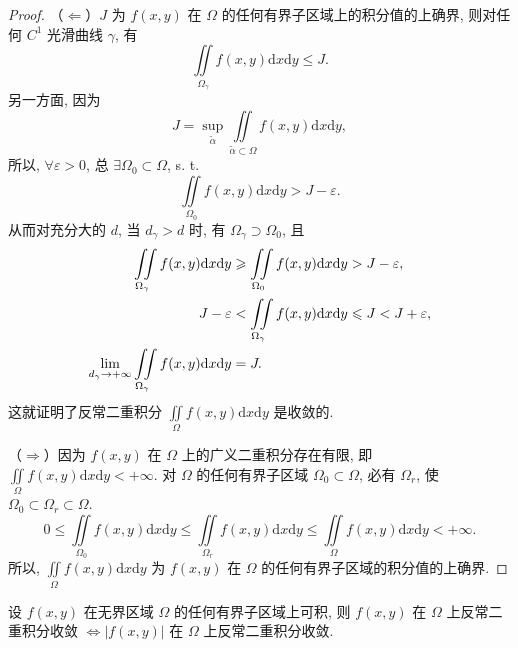 \begin{proof}
（$\Leftarrow$）$J$ 为 $f(x, y)$ 在 $\Omega$ 的任何有界子区域上的积分值的上确界,
则对任何 $C^{1}$ 光滑曲线 $\gamma$, 有
\[
\iint\limits_{\Omega_{\gamma}} f(x,y) \mathrm{d}x\mathrm{d}y \leqslant J.
\]
另一方面, 因为
\[
J = \sup\limits_{\tilde{\alpha}} \iint\limits_{\tilde{\alpha} \subset \Omega} f(x,y) \mathrm{d}x\mathrm{d}y,
\]
所以, $\forall \varepsilon > 0$, 总 $\exists \Omega_{0} \subset \Omega$, s. t.\
\[
\iint\limits_{\Omega_{0}} f(x,y) \mathrm{d}x\mathrm{d}y > J - \varepsilon.
\]
从而对充分大的 $d$, 当 $d_{\gamma} > d$ 时, 有 $\Omega_{\gamma} \supset \Omega_{0}$, 且
\[
\begin{aligned}
\iint\limits_{\Omega_{\gamma}} f(x,y) \mathrm{d}x\mathrm{d}y
&\geqslant \iint\limits_{\Omega_{0}} f(x,y) \mathrm{d}x\mathrm{d}y > J - \varepsilon, \notag\\
J - \varepsilon &< \iint\limits_{\Omega_{\gamma}} f(x,y) \mathrm{d}x\mathrm{d}y
\leqslant J < J + \varepsilon, \notag\\
\lim_{d_{\gamma} \to +\infty} \iint\limits_{\Omega_{\gamma}} f(x,y) \mathrm{d}x\mathrm{d}y &= J. \notag
\end{aligned}
\]
这就证明了反常二重积分 $\iint\limits_{\Omega} f(x,y) \mathrm{d}x\mathrm{d}y$ 是收敛的.

（$\Rightarrow$）因为 $f(x, y)$ 在 $\Omega$ 上的广义二重积分存在有限, 即
$\iint\limits_{\Omega} f(x,y) \mathrm{d}x\mathrm{d}y < +\infty$.
对 $\Omega$ 的任何有界子区域 $\Omega_{0} \subset \Omega$, 必有 $\Omega_{r}$, 使
$\Omega_{0} \subset \Omega_{r} \subset \Omega$.
\[
0 \leqslant \iint\limits_{\Omega_{0}} f(x,y) \mathrm{d}x\mathrm{d}y
\leqslant \iint\limits_{\Omega_{r}} f(x,y) \mathrm{d}x\mathrm{d}y
\leqslant \iint\limits_{\Omega} f(x,y) \mathrm{d}x\mathrm{d}y < +\infty.
\]
所以, $\iint\limits_{\Omega} f(x,y) \mathrm{d}x\mathrm{d}y$ 为 $f(x, y)$
在 $\Omega$ 的任何有界子区域的积分值的上确界.
\end{proof}

\begin{theorem}\label{thm:10.6.3}
设 $f(x,y)$ 在无界区域 $\Omega$ 的任何有界子区域上可积, 则
$f(x,y)$ 在 $\Omega$ 上反常二重积分收敛
$\Leftrightarrow |f(x,y)|$ 在 $\Omega$ 上反常二重积分收敛.
\end{theorem}

